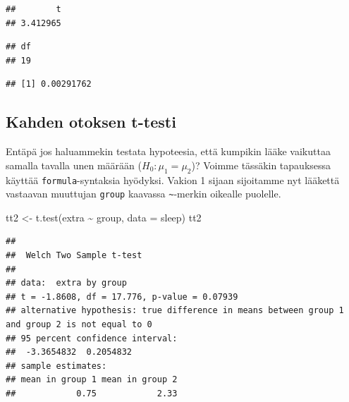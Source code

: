 \documentclass[
]{book}
\newenvironment{Shaded}{\begin{snugshade}}{\end{snugshade}}
\newcommand{\AttributeTok}[1]{\textcolor[rgb]{0.77,0.63,0.00}{#1}}
\newcommand{\CommentTok}[1]{\textcolor[rgb]{0.56,0.35,0.01}{\textit{#1}}}
\newcommand{\FunctionTok}[1]{\textcolor[rgb]{0.00,0.00,0.00}{#1}}
\newcommand{\NormalTok}[1]{#1}
\newcommand{\OtherTok}[1]{\textcolor[rgb]{0.56,0.35,0.01}{#1}}
\newcommand{\SpecialCharTok}[1]{\textcolor[rgb]{0.00,0.00,0.00}{#1}}
\begin{document}
\begin{verbatim}
##        t 
## 3.412965
\end{verbatim}

\begin{Shaded}
\end{Shaded}

\begin{verbatim}
## df 
## 19
\end{verbatim}

\begin{Shaded}
\end{Shaded}

\begin{verbatim}
## [1] 0.00291762
\end{verbatim}

\hypertarget{kahden-otoksen-t-testi}{%
\subsection{Kahden otoksen t-testi}\label{kahden-otoksen-t-testi}}

Entäpä jos haluammekin testata hypoteesia, että kumpikin lääke vaikuttaa samalla tavalla unen määrään (\(H_0 : \mu_1 = \mu_2\))? Voimme tässäkin tapauksessa käyttää \texttt{formula}-syntaksia hyödyksi. Vakion 1 sijaan sijoitamme nyt lääkettä vastaavan muuttujan \texttt{group} kaavassa \texttt{\textasciitilde{}}-merkin oikealle puolelle.

\begin{Shaded}
\begin{Highlighting}[]
\NormalTok{tt2 }\OtherTok{\textless{}{-}} \FunctionTok{t.test}\NormalTok{(extra }\SpecialCharTok{\textasciitilde{}}\NormalTok{ group, }\AttributeTok{data =}\NormalTok{ sleep)}
\NormalTok{tt2}
\end{Highlighting}
\end{Shaded}

\begin{verbatim}
## 
##  Welch Two Sample t-test
## 
## data:  extra by group
## t = -1.8608, df = 17.776, p-value = 0.07939
## alternative hypothesis: true difference in means between group 1 and group 2 is not equal to 0
## 95 percent confidence interval:
##  -3.3654832  0.2054832
## sample estimates:
## mean in group 1 mean in group 2 
##            0.75            2.33
\end{verbatim}
\end{document}
